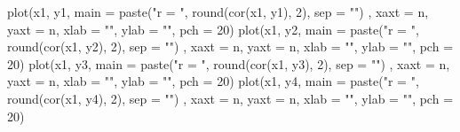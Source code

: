 \documentclass[
  letterpaper,
  DIV=11,
  numbers=noendperiod]{scrreprt}
\newenvironment{Shaded}{\begin{snugshade}}{\end{snugshade}}
\newcommand{\AttributeTok}[1]{\textcolor[rgb]{0.40,0.45,0.13}{#1}}
\newcommand{\DecValTok}[1]{\textcolor[rgb]{0.68,0.00,0.00}{#1}}
\newcommand{\FunctionTok}[1]{\textcolor[rgb]{0.28,0.35,0.67}{#1}}
\newcommand{\NormalTok}[1]{\textcolor[rgb]{0.00,0.23,0.31}{#1}}
\newcommand{\StringTok}[1]{\textcolor[rgb]{0.13,0.47,0.30}{#1}}
\begin{document}
\begin{Shaded}
\begin{Highlighting}[]
\FunctionTok{plot}\NormalTok{(x1, y1, }\AttributeTok{main =} \FunctionTok{paste}\NormalTok{(}\StringTok{"r = "}\NormalTok{, }\FunctionTok{round}\NormalTok{(}\FunctionTok{cor}\NormalTok{(x1, y1), }\DecValTok{2}\NormalTok{), }\AttributeTok{sep =} \StringTok{""}\NormalTok{)}
\NormalTok{     , }\AttributeTok{xaxt =} \StringTok{\textquotesingle{}n\textquotesingle{}}\NormalTok{, }\AttributeTok{yaxt =} \StringTok{\textquotesingle{}n\textquotesingle{}}\NormalTok{, }\AttributeTok{xlab =} \StringTok{""}\NormalTok{, }\AttributeTok{ylab =} \StringTok{""}\NormalTok{, }\AttributeTok{pch =} \DecValTok{20}\NormalTok{)}
\FunctionTok{plot}\NormalTok{(x1, y2, }\AttributeTok{main =} \FunctionTok{paste}\NormalTok{(}\StringTok{"r = "}\NormalTok{, }\FunctionTok{round}\NormalTok{(}\FunctionTok{cor}\NormalTok{(x1, y2), }\DecValTok{2}\NormalTok{), }\AttributeTok{sep =} \StringTok{""}\NormalTok{)}
\NormalTok{     , }\AttributeTok{xaxt =} \StringTok{\textquotesingle{}n\textquotesingle{}}\NormalTok{, }\AttributeTok{yaxt =} \StringTok{\textquotesingle{}n\textquotesingle{}}\NormalTok{, }\AttributeTok{xlab =} \StringTok{""}\NormalTok{, }\AttributeTok{ylab =} \StringTok{""}\NormalTok{, }\AttributeTok{pch =} \DecValTok{20}\NormalTok{)}
\FunctionTok{plot}\NormalTok{(x1, y3, }\AttributeTok{main =} \FunctionTok{paste}\NormalTok{(}\StringTok{"r = "}\NormalTok{, }\FunctionTok{round}\NormalTok{(}\FunctionTok{cor}\NormalTok{(x1, y3), }\DecValTok{2}\NormalTok{), }\AttributeTok{sep =} \StringTok{""}\NormalTok{)}
\NormalTok{     , }\AttributeTok{xaxt =} \StringTok{\textquotesingle{}n\textquotesingle{}}\NormalTok{, }\AttributeTok{yaxt =} \StringTok{\textquotesingle{}n\textquotesingle{}}\NormalTok{, }\AttributeTok{xlab =} \StringTok{""}\NormalTok{, }\AttributeTok{ylab =} \StringTok{""}\NormalTok{, }\AttributeTok{pch =} \DecValTok{20}\NormalTok{)}
\FunctionTok{plot}\NormalTok{(x1, y4, }\AttributeTok{main =} \FunctionTok{paste}\NormalTok{(}\StringTok{"r = "}\NormalTok{, }\FunctionTok{round}\NormalTok{(}\FunctionTok{cor}\NormalTok{(x1, y4), }\DecValTok{2}\NormalTok{), }\AttributeTok{sep =} \StringTok{""}\NormalTok{)}
\NormalTok{     , }\AttributeTok{xaxt =} \StringTok{\textquotesingle{}n\textquotesingle{}}\NormalTok{, }\AttributeTok{yaxt =} \StringTok{\textquotesingle{}n\textquotesingle{}}\NormalTok{, }\AttributeTok{xlab =} \StringTok{""}\NormalTok{, }\AttributeTok{ylab =} \StringTok{""}\NormalTok{, }\AttributeTok{pch =} \DecValTok{20}\NormalTok{)}
\end{Highlighting}
\end{Shaded}
\end{document}
